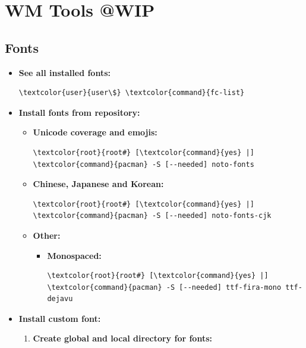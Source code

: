 \documentclass[10pt, a4paper, onecolumn, oneside, titlepage, openany]{book}
\begin{document}
\chapter{WM Tools @WIP}
\section{Fonts}
\begin{itemize}
    \item \textbf{See all installed fonts:}
\begin{Verbatim}[commandchars=\\\{\}]
\textcolor{user}{user\$} \textcolor{command}{fc-list}
\end{Verbatim}
    \item \textbf{Install fonts from repository:}
    \begin{itemize}
        \item \textbf{Unicode coverage and emojis:}
\begin{Verbatim}[commandchars=\\\{\}]
\textcolor{root}{root#} [\textcolor{command}{yes} |] \textcolor{command}{pacman} -S [--needed] noto-fonts
\end{Verbatim}        
        \item \textbf{Chinese, Japanese and Korean:}
\begin{Verbatim}[commandchars=\\\{\}]
\textcolor{root}{root#} [\textcolor{command}{yes} |] \textcolor{command}{pacman} -S [--needed] noto-fonts-cjk
\end{Verbatim}
        \item \textbf{Other:}
        \begin{itemize}
            \item \textbf{Monospaced:}
\begin{Verbatim}[commandchars=\\\{\}]
\textcolor{root}{root#} [\textcolor{command}{yes} |] \textcolor{command}{pacman} -S [--needed] ttf-fira-mono ttf-dejavu
\end{Verbatim}
        \end{itemize}
    \end{itemize}
    \item \textbf{Install custom font:}
    \begin{enumerate}
        \item \textbf{Create global and local directory for fonts:}
\begin{Verbatim}[commandchars=\\\{\}]

\end{Verbatim}
\end{enumerate}
\end{itemize}
\end{document}
